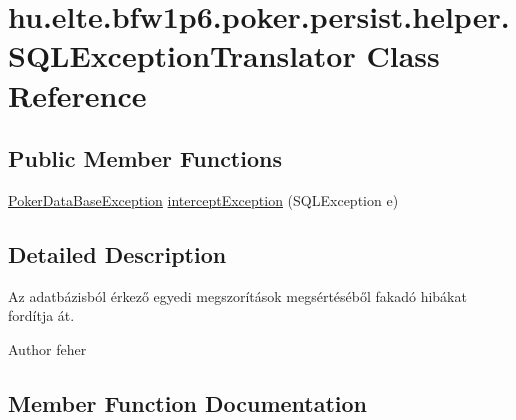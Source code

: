 \hypertarget{classhu_1_1elte_1_1bfw1p6_1_1poker_1_1persist_1_1helper_1_1_s_q_l_exception_translator}{}\section{hu.\+elte.\+bfw1p6.\+poker.\+persist.\+helper.\+S\+Q\+L\+Exception\+Translator Class Reference}
\label{classhu_1_1elte_1_1bfw1p6_1_1poker_1_1persist_1_1helper_1_1_s_q_l_exception_translator}
\subsection*{Public Member Functions}
\begin{DoxyCompactItemize}
\item 
\hyperlink{classhu_1_1elte_1_1bfw1p6_1_1poker_1_1exception_1_1_poker_data_base_exception}{Poker\+Data\+Base\+Exception} \hyperlink{classhu_1_1elte_1_1bfw1p6_1_1poker_1_1persist_1_1helper_1_1_s_q_l_exception_translator_a341b6691d31335f13241a92df1476d8c}{intercept\+Exception} (S\+Q\+L\+Exception e)
\end{DoxyCompactItemize}


\subsection{Detailed Description}
Az adatbázisból érkező egyedi megszorítások megsértéséből fakadó hibákat fordítja át. \begin{DoxyAuthor}{Author}
feher 
\end{DoxyAuthor}


\subsection{Member Function Documentation}
\hypertarget{classhu_1_1elte_1_1bfw1p6_1_1poker_1_1persist_1_1helper_1_1_s_q_l_exception_translator_a341b6691d31335f13241a92df1476d8c}{}
